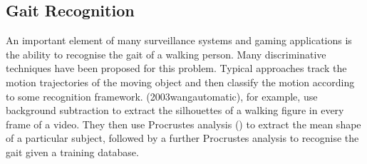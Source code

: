 \subsection{Gait Recognition}

An important element of many surveillance systems and gaming applications is the ability to recognise the gait of a walking person. Many discriminative techniques have been proposed for this problem. Typical approaches track the motion trajectories of the moving object and then classify the motion according to some recognition framework. (2003wangautomatic), for example, use background subtraction to extract the silhouettes of a walking figure in every frame of a video. They then use Procrustes analysis () to extract the mean shape of a particular subject, followed by a further Procrustes analysis to recognise the gait given a training database. 

